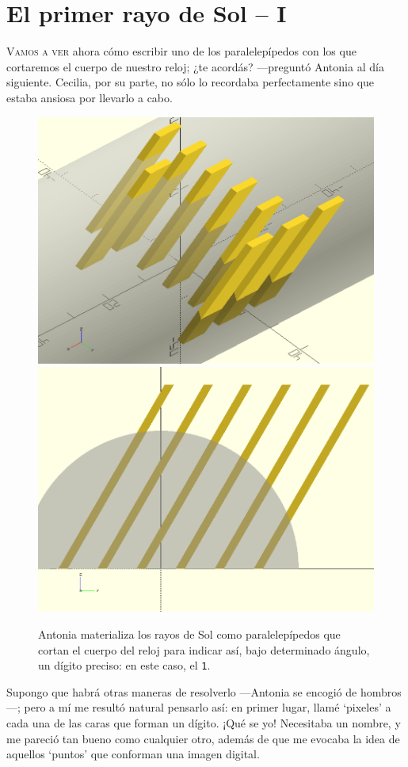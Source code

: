 \chapter{El primer rayo de Sol -- I}
\label{cap:el-primer-rayo-de-sol-i}

\lettrine[ante=\raisebox{-1.5ex}{\Large ---},lines=2]{V}{amos a ver}
ahora cómo escribir uno de los paralelepípedos con los que cortaremos
el cuerpo de nuestro reloj; ¿te acordás?  ---pre\-gun\-tó Antonia al
día siguiente. Cecilia, por su parte, no sólo lo recordaba
perfectamente sino que estaba ansiosa por llevarlo a cabo.

\vspace{1em}

\begin{figure}[ht]
  \centering
  \includegraphics[width=.49\textwidth]{imagenes/digito-soslayo}\hfill
  \includegraphics[width=.49\textwidth]{imagenes/digito-perfil} 
  \caption{Antonia materializa los rayos de Sol como paralelepípedos
    que cortan el cuerpo del reloj para indicar así, bajo determinado
    ángulo, un dígito preciso: en este caso, el \texttt{1}.}
  \label{fig:digitos-soslayo-perfil}
\end{figure}


\guillemotright Supongo que habrá otras maneras de resolverlo
---An\-to\-nia se encogió de hombros---; pero a mí me resultó natural
pensarlo así: en primer lugar, llamé `pixeles' a cada una de las caras
que forman un dígito. ¡Qué se yo! Necesitaba un nombre, y me pareció
tan bueno como cualquier otro, además de que me evocaba la idea de
aquellos `puntos' que conforman una imagen digital.

